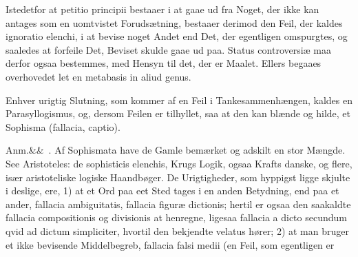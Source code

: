\documentclass[12pt]{book}
\def\sperr#1{#1}%
\def\textit#1{#1}%
\def\emph#1{#1}%
\newcommand{\sperr}[1]{\textls[180]{#1}}
\newcommand{\anm}[1]{%
  \par\vspace{0.5\baselineskip}%
  \noindent\hspace{\parindent}\sperr{Anm.}\ifx&#1&\else~\textit{#1}.\fi
  \enspace\ignorespaces
}
\newcommand{\opage}[1]{\marginnote{\footnotesize\textit{[#1]}}}
\begin{document}
Istedetfor at \textit{petitio principii} bestaaer i at gaae ud fra Noget, der
ikke kan antages som en uomtvistet Forudsætning, bestaaer derimod den Feil, der
kaldes \textit{ignoratio elenchi}, i at bevise noget Andet end Det, der
egentligen omspurgtes, og saaledes at forfeile Det, Beviset skulde gaae ud paa.
\textit{Status controversiæ} maa derfor ogsaa bestemmes, med Hensyn til det, der
er \emph{Maalet}. Ellers begaaes overhovedet let en \textit{metabasis in aliud
genus}.

Enhver urigtig Slutning, som kommer af en Feil i Tankesammenhængen, kaldes en
\emph{Parasyllogismus}, og, dersom Feilen er tilhyllet, saa at den kan blænde og
hilde, et \emph{Sophisma} (\textit{fallacia, captio}).

\anm{} Af \emph{Sophismata} have de Gamle bemærket og adskilt en stor Mængde.
See Aristoteles: \textit{de sophisticis elenchis}, Krugs Logik, ogsaa Krafts
danske, og flere, især aristoteliske logiske Haandbøger. De Urigtigheder, som
hyppigst ligge skjulte i deslige, ere, 1) at et Ord
\opage{362} paa eet Sted tages i en anden Betydning, end paa et ander, \textit{fallacia
ambiguitatis}, \textit{fallacia figuræ dictionis}; hertil er ogsaa den saakaldte
\textit{fallacia compositionis} og \textit{divisionis} at henregne, ligesaa
\textit{fallacia a dicto secundum qvid ad dictum simpliciter}, hvortil den
bekjendte \textit{velatus} hører; 2) at man bruger et ikke bevisende
\emph{Middelbegreb}, \textit{fallacia falsi medii} (en Feil, som egentligen er
\end{document}
